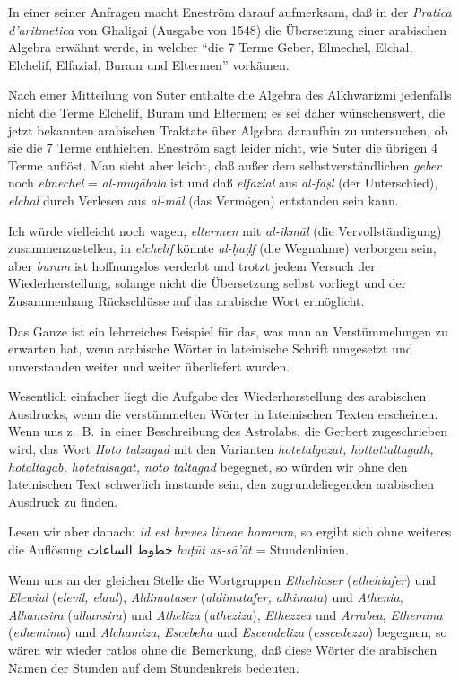 \documentclass[11pt,a4paper]{article}
\newcommand{\RL}[1]{\beginR#1\endR}
\newcommand{\ar}[1]{{\arabicfont\RL{#1}}}
\newcommand{\enquote}[1]{``#1''}
\begin{document}
In einer seiner Anfragen macht Enestr\"om darauf aufmerksam, da\ss{} in der \textit{Pratica d'aritmetica} von Ghaligai (Ausgabe von 1548) die \"Ubersetzung einer arabischen Algebra erw\"ahnt werde, in welcher \enquote{die 7 Terme Geber, Elmechel, Elchal, Elchelif, Elfazial, Buram und Eltermen} vork\"amen.

Nach einer Mitteilung von Suter enthalte die Algebra des Alkhwarizmi jedenfalls nicht die Terme Elchelif, Buram und Eltermen; es sei daher w\"unschenswert, die jetzt bekannten arabischen Traktate \"uber Algebra daraufhin zu untersuchen, ob sie die 7 Terme enthielten. Enestr\"om sagt leider nicht, wie Suter die \"ubrigen 4 Terme aufl\"ost. Man sieht aber leicht, da\ss{} au\ss{}er dem selbstverst\"andlichen \textit{geber} noch \textit{elmechel} = \textit{al-muq\=abala} ist und da\ss{} \textit{elfazial} aus \textit{al-fa\d{s}l} (der Unterschied), \textit{elchal} durch Verlesen aus \textit{al-m\=al} (das Verm\"ogen) entstanden sein kann.

Ich w\"urde vielleicht noch wagen, \textit{eltermen} mit \textit{al-ikm\=al} (die Vervollst\"andigung) zusammenzustellen, in \textit{elchelif} k\"onnte \textit{al-\d{h}a\d{d}f} (die Wegnahme) verborgen sein, aber \textit{buram} ist hoffnungslos verderbt und trotzt jedem Versuch der Wiederherstellung, solange nicht die \"Ubersetzung selbst vorliegt und der Zusammenhang R\"uckschl\"usse auf das arabische Wort erm\"oglicht.

Das Ganze ist ein lehrreiches Beispiel f\"ur das, was man an Verst\"ummelungen zu erwarten hat, wenn arabische W\"orter in lateinische Schrift umgesetzt und unverstanden weiter und weiter \"uberliefert wurden.

Wesentlich einfacher liegt die Aufgabe der Wiederherstellung des arabischen Ausdrucks, wenn die verst\"ummelten W\"orter in lateinischen Texten erscheinen. Wenn uns z.\ B.\ in einer Beschreibung des Astrolabs, die Gerbert zugeschrieben wird, das Wort \textit{Hoto talzagad} mit den Varianten \textit{hotetalgazat, hottottaltagath, hotaltagab, hotetalsagat, noto taltagad} begegnet, so w\"urden wir ohne den lateinischen Text schwerlich imstande sein, den zugrundeliegenden arabischen Ausdruck zu finden.

Lesen wir aber danach: \textit{id est breves lineae horarum}, so ergibt sich ohne weiteres die Aufl\"osung \ar{خطوط الساعات} \textit{hu\d{t}\=ut as-s\=a'\=at} = Stundenlinien.

Wenn uns an der gleichen Stelle die Wortgruppen \textit{Ethehiaser} (\textit{ethehiafer}) und \textit{Elewiul} (\textit{elevil, elaul}), \textit{Aldimataser} (\textit{aldimatafer, alhimata}) und \textit{Athenia}, \textit{Alhamsira} (\textit{alhansira}) und \textit{Atheliza} (\textit{atheziza}), \textit{Ethezzea} und \textit{Arrabea}, \textit{Ethemina} (\textit{ethemima}) und \textit{Alchamiza}, \textit{Escebeha} und \textit{Escendeliza} (\textit{esscedezza}) begegnen, so w\"aren wir wieder ratlos ohne die Bemerkung, da\ss{} diese W\"orter die arabischen Namen der Stunden auf dem Stundenkreis bedeuten.
\end{document}
